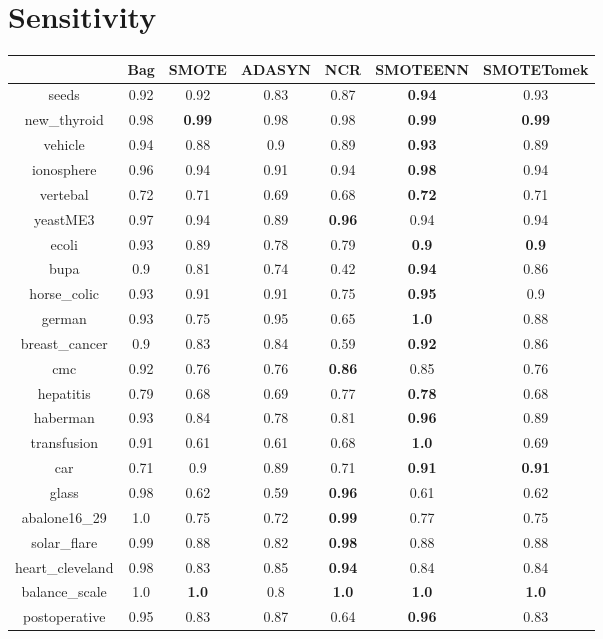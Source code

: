 \documentclass{article}%
\begin{document}
%
\section*{Sensitivity}%
\begin{tabular}{c|cccccc}%
&Bag&SMOTE&ADASYN&NCR&SMOTEENN&SMOTETomek\\%
\hline%
seeds&0.92&0.92&0.83&0.87&\textbf{0.94}&0.93\\%
new\_thyroid&0.98&\textbf{0.99}&0.98&0.98&\textbf{0.99}&\textbf{0.99}\\%
vehicle&0.94&0.88&0.9&0.89&\textbf{0.93}&0.89\\%
ionosphere&0.96&0.94&0.91&0.94&\textbf{0.98}&0.94\\%
vertebal&0.72&0.71&0.69&0.68&\textbf{0.72}&0.71\\%
yeastME3&0.97&0.94&0.89&\textbf{0.96}&0.94&0.94\\%
ecoli&0.93&0.89&0.78&0.79&\textbf{0.9}&\textbf{0.9}\\%
bupa&0.9&0.81&0.74&0.42&\textbf{0.94}&0.86\\%
horse\_colic&0.93&0.91&0.91&0.75&\textbf{0.95}&0.9\\%
german&0.93&0.75&0.95&0.65&\textbf{1.0}&0.88\\%
breast\_cancer&0.9&0.83&0.84&0.59&\textbf{0.92}&0.86\\%
cmc&0.92&0.76&0.76&\textbf{0.86}&0.85&0.76\\%
hepatitis&0.79&0.68&0.69&0.77&\textbf{0.78}&0.68\\%
haberman&0.93&0.84&0.78&0.81&\textbf{0.96}&0.89\\%
transfusion&0.91&0.61&0.61&0.68&\textbf{1.0}&0.69\\%
car&0.71&0.9&0.89&0.71&\textbf{0.91}&\textbf{0.91}\\%
glass&0.98&0.62&0.59&\textbf{0.96}&0.61&0.62\\%
abalone16\_29&1.0&0.75&0.72&\textbf{0.99}&0.77&0.75\\%
solar\_flare&0.99&0.88&0.82&\textbf{0.98}&0.88&0.88\\%
heart\_cleveland&0.98&0.83&0.85&\textbf{0.94}&0.84&0.84\\%
balance\_scale&1.0&\textbf{1.0}&0.8&\textbf{1.0}&\textbf{1.0}&\textbf{1.0}\\%
postoperative&0.95&0.83&0.87&0.64&\textbf{0.96}&0.83\\%
\end{tabular}

%
\end{document}
